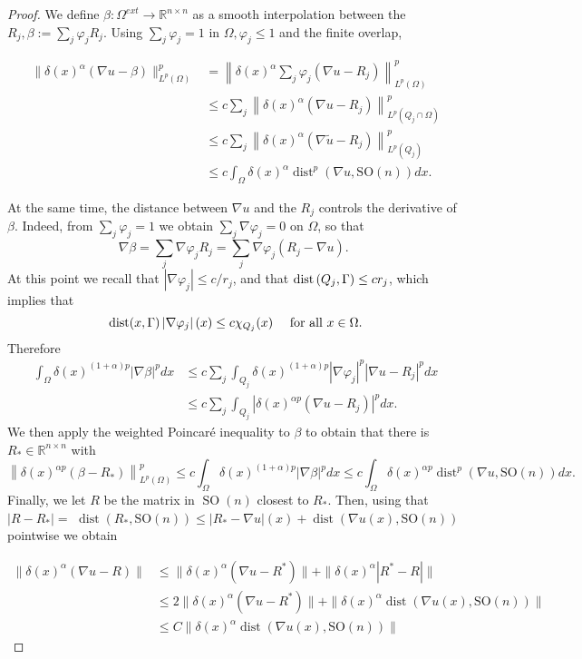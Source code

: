 \begin{proof}
We define $\beta: \Omega^{ext} \rightarrow \mathbb{R}^{n \times n}$ as a smooth interpolation between the $R_j, \beta:=\sum_j \varphi_j R_j$. Using $\sum_j \varphi_j=1$ in $\Omega, \varphi_j \leq 1$ and the finite overlap,

\begin{align*}
\|\delta(x)^\alpha(\nabla u-\beta)\|_{L^p(\Omega)}^p&=\left\|\delta(x)^\alpha\sum_j \varphi_j\left(\nabla u-R_j\right)\right\|_{L^p(\Omega)}^p \\ &\leq c \sum_j\left\|\delta(x)^\alpha(\nabla u-R_j)\right\|_{L^p\left(Q_j\cap \Omega\right)}^p \\
 &\leq c \sum_j\left\|\delta(x)^\alpha(\nabla \tilde{u}-R_j)\right\|_{L^p\left(Q_j\right)}^p \\
& \leq  c \int_{\Omega} \delta(x)^\alpha \operatorname{dist}^p(\nabla u, \mathrm{SO}(n)) d x .
\end{align*}

At the same time, the distance between $\nabla u$ and the $R_j$ controls the derivative of $\beta$. Indeed, from $\sum_j \varphi_j=1$ we obtain $\sum_j \nabla \varphi_j=0$ on $\Omega$, so that
$$
\nabla \beta=\sum_j \nabla \varphi_j R_j=\sum_j \nabla \varphi_j\left(R_j-\nabla u\right) \text {. }
$$
At this point we recall that $\left|\nabla \varphi_j\right| \leq c / r_j$, and that $\operatorname{dist}\left(Q_j, \Gamma\right) \leq c r_j$, which implies that
$$
\operatorname{dist}(x, \Gamma)\left|\nabla \varphi_j\right|(x) \leq c \chi_{Q_j}(x) \quad \text { for all } x \in \Omega .
$$
Therefore
$$
\begin{aligned}
\int_{\Omega} \delta(x)^{(1+\alpha)p}|\nabla \beta|^p d x & \leq c \sum_j \int_{Q_j} \delta(x)^{(1+\alpha)p}\left|\nabla \varphi_j\right|^p\left|\nabla u-R_j\right|^p d x \\
& \leq c \sum_j \int_{Q_j}\left|\delta(x)^{\alpha p}(\nabla u-R_j)\right|^p d x .
\end{aligned}
$$
We then apply the weighted Poincaré inequality to $\beta$ to obtain that there is $R_* \in \mathbb{R}^{n \times n}$ with
$$
\left\|\delta(x)^{\alpha p}(\beta-R_*)\right\|_{L^p(\Omega)}^p \leq c \int_{\Omega} \delta(x)^{(1+\alpha) p}|\nabla \beta|^p d x \leq c \int_{\Omega} \delta(x)^{\alpha p}\operatorname{dist}^p(\nabla u, \mathrm{SO}(n)) d x .
$$
Finally, we let $R$ be the matrix in $\operatorname{SO}(n)$ closest to $R_*$. Then, using that $\left|R-R_*\right|=$ $\operatorname{dist}\left(R_*, \mathrm{SO}(n)\right) \leq\left|R_*-\nabla u\right|(x)+\operatorname{dist}(\nabla u(x), \mathrm{SO}(n))$ pointwise we obtain

\begin{align*}
\|\delta(x)^\alpha(\nabla u-R)\|&\leq \|\delta(x)^\alpha(\nabla u-R^*)\|+\|\delta(x)^\alpha|R^*-R|\|\\
&\leq 2\|\delta(x)^\alpha(\nabla u-R^*)\| +\|\delta(x)^\alpha \operatorname{dist}(\nabla u(x), \mathrm{SO}(n))\|\\ 
&\leq C \|\delta(x)^\alpha \operatorname{dist}(\nabla u(x), \mathrm{SO}(n))\|
\end{align*}

\end{proof}

